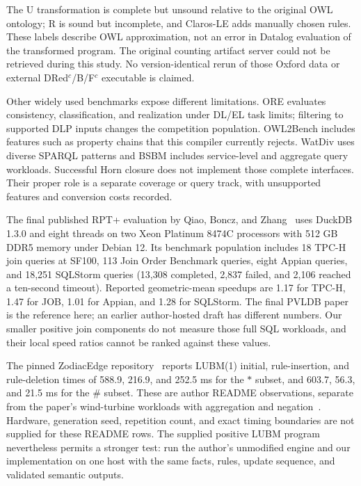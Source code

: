 The U transformation is complete but unsound relative to the original OWL
ontology; R is sound but incomplete, and Claros-LE adds manually chosen rules.
These labels describe OWL approximation, not an error in Datalog evaluation of
the transformed program. The original counting artifact server could not be
retrieved during this study. No version-identical rerun of those Oxford data
or external DRed$^c$/B/F$^c$ executable is claimed.

Other widely used benchmarks expose different limitations. ORE evaluates
consistency, classification, and realization under DL/EL task limits; filtering
to supported DLP inputs changes the competition population. OWL2Bench includes
features such as property chains that this compiler currently rejects. WatDiv
uses diverse SPARQL patterns and BSBM includes service-level and aggregate query
workloads. Successful Horn closure does not implement those complete interfaces.
Their proper role is a separate coverage or query track, with unsupported
features and conversion costs recorded.

The final published RPT+ evaluation by Qiao, Boncz, and Zhang~\cite{qiao2026}
uses DuckDB 1.3.0 and eight threads on two Xeon Platinum 8474C processors with
512 GB DDR5 memory under Debian 12. Its benchmark population includes 18
TPC-H join queries at SF100, 113 Join Order Benchmark queries, eight Appian
queries, and 18,251 SQLStorm queries (13,308 completed, 2,837 failed, and 2,106
reached a ten-second timeout). Reported geometric-mean speedups are 1.17 for
TPC-H, 1.47 for JOB, 1.01 for Appian, and 1.28 for SQLStorm. The final PVLDB
paper is the reference here; an earlier author-hosted draft has different
numbers. Our smaller positive join components do not measure those full SQL
workloads, and their local speed ratios cannot be ranked against these values.

The pinned ZodiacEdge repository~\cite{zodiacartifact} reports LUBM(1) initial,
rule-insertion, and rule-deletion times of 588.9, 216.9, and 252.5 ms for the
$*$ subset, and 603.7, 56.3, and 21.5 ms for the $\#$ subset. These are author
README observations, separate from the paper's wind-turbine workloads with
aggregation and negation~\cite{xu2023}. Hardware, generation seed, repetition
count, and exact timing boundaries are not supplied for these README rows.
The supplied positive LUBM program nevertheless permits a stronger test: run
the author's unmodified engine and our implementation on one host with the
same facts, rules, update sequence, and validated semantic outputs.
